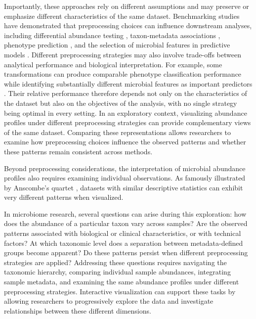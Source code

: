 \documentclass[pdflatex,sn-vancouver-num]{sn-jnl}%
\theoremstyle{thmstyleone}%
\theoremstyle{thmstyletwo}%
\theoremstyle{thmstylethree}%
\begin{document}
Importantly, these approaches rely on different assumptions and may preserve or emphasize different characteristics of the same dataset. Benchmarking studies have demonstrated that preprocessing choices can influence downstream analyses, including differential abundance testing \citep{weiss_normalization_2017,nearing_microbiome_2022}, taxon-metadata associations \citep{llorens-rico_benchmarking_2021}, phenotype prediction \citep{wang_comparison_2024}, and the selection of microbial features in predictive models \citep{karwowska_effects_2025}. Different preprocessing strategies may also involve trade-offs between analytical performance and biological interpretation. For example, some transformations can produce comparable phenotype classification performance while identifying substantially different microbial features as important predictors \citep{karwowska_effects_2025}. Their relative performance therefore depends not only on the characteristics of the dataset but also on the objectives of the analysis, with no single strategy being optimal in every setting. In an exploratory context, visualizing abundance profiles under different preprocessing strategies can provide complementary views of the same dataset. Comparing these representations allows researchers to examine how preprocessing choices influence the observed patterns and whether these patterns remain consistent across methods.

Beyond preprocessing considerations, the interpretation of microbial abundance profiles also requires examining individual observations. As famously illustrated by Anscombe's quartet \citep{anscombe_graphs_1973}, datasets with similar descriptive statistics can exhibit very different patterns when visualized.

In microbiome research, several questions can arise during this exploration: how does the abundance of a particular taxon vary across samples? Are the observed patterns associated with biological or clinical characteristics, or with technical factors? At which taxonomic level does a separation between metadata-defined groups become apparent? Do these patterns persist when different preprocessing strategies are applied? Addressing these questions requires navigating the taxonomic hierarchy, comparing individual sample abundances, integrating sample metadata, and examining the same abundance profiles under different preprocessing strategies. Interactive visualization can support these tasks by allowing researchers to progressively explore the data and investigate relationships between these different dimensions.
\end{document}
